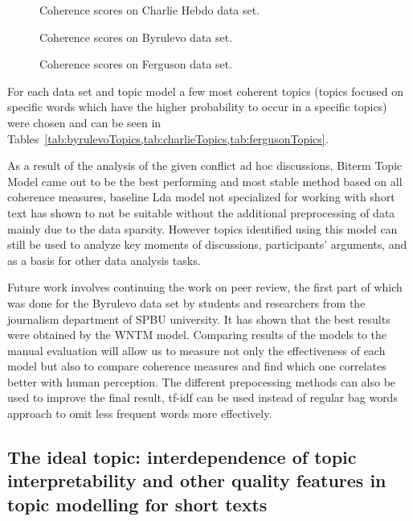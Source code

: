 \begin{figure}[ht]
	\caption{Coherence scores on Charlie Hebdo data set.}\label{fig:charlieCoherence}
\end{figure}

\begin{figure}[ht]
	\caption{Coherence scores on Byrulevo data set.}\label{fig:byrulevoCoherence}
\end{figure}

\begin{figure}[ht]
	\caption{Coherence scores on Ferguson data set.}\label{fig:fergusonCoherence}
\end{figure}

For each data set and topic model a few most coherent topics (topics focused on specific words which have the higher probability to occur in a specific topics) were chosen and can be seen in Tables~\cref{tab:byrulevoTopics,tab:charlieTopics,tab:fergusonTopics}.

As a result of the analysis of the given conflict ad hoc discussions, Biterm Topic Model came out to be the best performing and most stable method based on all coherence measures, baseline Lda model not specialized for working with short text has shown to not be suitable without the additional preprocessing of data mainly due to the data sparsity. However topics identified using this model can still be used to analyze key moments of discussions, participants’ arguments, and as a basis for other data analysis tasks.

Future work involves continuing the work on peer review, the first part of which was done for the Byrulevo data set by students and researchers from the journalism department of SPBU university. It has shown that the best results were obtained by the WNTM model. Comparing results of the models to the manual evaluation will allow us to measure not only the effectiveness of each model but also to compare coherence measures and find which one correlates better with human perception. The different prepocessing methods can also be used to improve the final result, tf-idf can be used instead of regular bag words approach to omit less frequent words more effectively.

\subsection{The ideal topic: interdependence of topic interpretability and other quality features in topic modelling for short texts}\label{subsec:ch5/sec2/sub3}

